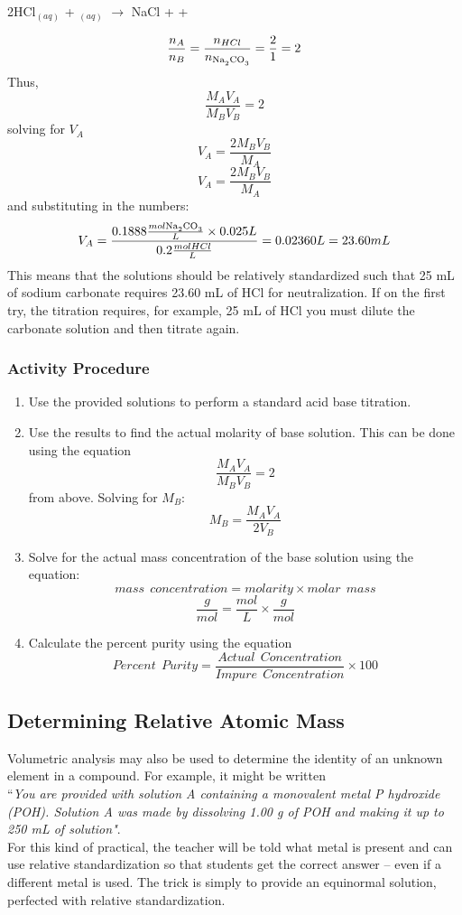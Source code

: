 \begin{enumerate}
{\begin{center}
2HCl$_(aq)$ + $_(aq)$ $\longrightarrow$ NaCl +  + 
\end{center}
$$\frac{n_A}{n_B}=\frac{n_{HCl}}{n_{\ce{Na2CO3}}}=\frac{2}{1}=2$$
Thus,
$$\frac{M_A V_A}{M_B V_B}=2$$
solving for $V_A$
$$V_A=\frac{2 M_B V_B}{M_A}$$
$$V_A=\frac{2 M_B V_B}{M_A}$$
and substituting in the numbers: 
$$V_A=\frac{0.1888 \frac{mol \ce{Na2CO3}}{L} \times 0.025L}{0.2\frac{mol HCl}{L}}=0.02360L = 23.60 mL$$
This means that the solutions should be relatively standardized such that 25 mL of sodium carbonate requires 23.60 mL of HCl for neutralization. If on the first try, the titration requires, for example, 25 mL of HCl you must dilute the carbonate solution and then titrate again.}
\end{enumerate}

\subsubsection{Activity Procedure}
\begin{enumerate}
\item {Use the provided solutions to perform a standard acid base titration.}
\item{Use the results to find the actual molarity of base solution. This can be done using the equation 
$$\frac{M_A V_A}{M_B V_B} = 2$$
from above. Solving for $M_B$:
$$M_B = \frac{M_A V_A}{2V_B}$$}
\item{Solve for the actual mass concentration of the base solution using the equation: $$mass\:\: concentration = molarity \times molar\:\:mass$$
$$\frac{g}{mol} = \frac{mol}{L}\times \frac{g}{mol}$$}
\item{Calculate the percent purity using the equation
$$Percent\:\:Purity = \frac{Actual \:\:Concentration}{Impure\:\:Concentration}\times 100$$}
\end{enumerate}

\subsection{Determining Relative Atomic Mass}

Volumetric analysis may also be used to determine the identity of an unknown element in a compound. For example, it might be written\\
 ``\textit{You are provided with solution A containing a monovalent metal P hydroxide (POH). Solution A was made by dissolving 1.00 g of POH and making it up to 250 mL of solution"}.\\ For this kind of practical, the teacher will be told what metal is present and can use relative standardization so that students get the correct answer -- even if a different metal is used. The trick is simply to provide an equinormal solution, perfected with relative standardization.

